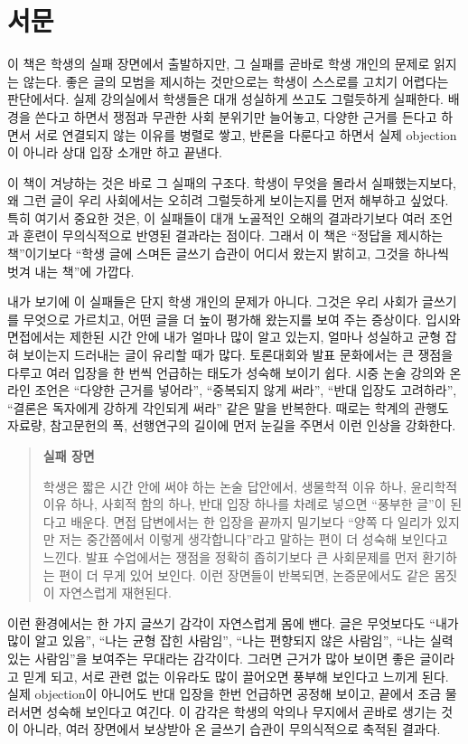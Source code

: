 \chapter{서문}\label{uxc11cuxbb38}

이 책은 학생의 실패 장면에서 출발하지만, 그 실패를 곧바로 학생 개인의 문제로 읽지는 않는다. 좋은 글의 모범을 제시하는 것만으로는 학생이 스스로를 고치기 어렵다는 판단에서다. 실제 강의실에서 학생들은 대개 성실하게 쓰고도 그럴듯하게 실패한다. 배경을 쓴다고 하면서 쟁점과 무관한 사회 분위기만 늘어놓고, 다양한 근거를 든다고 하면서 서로 연결되지 않는 이유를 병렬로 쌓고, 반론을 다룬다고 하면서 실제 objection이 아니라 상대 입장 소개만 하고 끝낸다.

이 책이 겨냥하는 것은 바로 그 실패의 구조다. 학생이 무엇을 몰라서 실패했는지보다, 왜 그런 글이 우리 사회에서는 오히려 그럴듯하게 보이는지를 먼저 해부하고 싶었다. 특히 여기서 중요한 것은, 이 실패들이 대개 노골적인 오해의 결과라기보다 여러 조언과 훈련이 무의식적으로 반영된 결과라는 점이다. 그래서 이 책은 ``정답을 제시하는 책''이기보다 ``학생 글에 스며든 글쓰기 습관이 어디서 왔는지 밝히고, 그것을 하나씩 벗겨 내는 책''에 가깝다.

내가 보기에 이 실패들은 단지 학생 개인의 문제가 아니다. 그것은 우리 사회가 글쓰기를 무엇으로 가르치고, 어떤 글을 더 높이 평가해 왔는지를 보여 주는 증상이다. 입시와 면접에서는 제한된 시간 안에 내가 얼마나 많이 알고 있는지, 얼마나 성실하고 균형 잡혀 보이는지 드러내는 글이 유리할 때가 많다. 토론대회와 발표 문화에서는 큰 쟁점을 다루고 여러 입장을 한 번씩 언급하는 태도가 성숙해 보이기 쉽다. 시중 논술 강의와 온라인 조언은 ``다양한 근거를 넣어라'', ``중복되지 않게 써라'', ``반대 입장도 고려하라'', ``결론은 독자에게 강하게 각인되게 써라'' 같은 말을 반복한다. 때로는 학계의 관행도 자료량, 참고문헌의 폭, 선행연구의 길이에 먼저 눈길을 주면서 이런 인상을 강화한다.

\begin{quote}
\textbf{실패 장면}

학생은 짧은 시간 안에 써야 하는 논술 답안에서, 생물학적 이유 하나, 윤리학적 이유 하나, 사회적 함의 하나, 반대 입장 하나를 차례로 넣으면 ``풍부한 글''이 된다고 배운다. 면접 답변에서는 한 입장을 끝까지 밀기보다 ``양쪽 다 일리가 있지만 저는 중간쯤에서 이렇게 생각합니다''라고 말하는 편이 더 성숙해 보인다고 느낀다. 발표 수업에서는 쟁점을 정확히 좁히기보다 큰 사회문제를 먼저 환기하는 편이 더 무게 있어 보인다. 이런 장면들이 반복되면, 논증문에서도 같은 몸짓이 자연스럽게 재현된다.
\end{quote}

이런 환경에서는 한 가지 글쓰기 감각이 자연스럽게 몸에 밴다. 글은 무엇보다도 ``내가 많이 알고 있음'', ``나는 균형 잡힌 사람임'', ``나는 편향되지 않은 사람임'', ``나는 실력 있는 사람임''을 보여주는 무대라는 감각이다. 그러면 근거가 많아 보이면 좋은 글이라고 믿게 되고, 서로 관련 없는 이유라도 많이 끌어오면 풍부해 보인다고 느끼게 된다. 실제 objection이 아니어도 반대 입장을 한번 언급하면 공정해 보이고, 끝에서 조금 물러서면 성숙해 보인다고 여긴다. 이 감각은 학생의 악의나 무지에서 곧바로 생기는 것이 아니라, 여러 장면에서 보상받아 온 글쓰기 습관이 무의식적으로 축적된 결과다.

